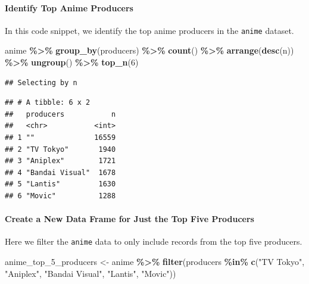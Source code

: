 \documentclass[
  b5paper]{book}
\newenvironment{Shaded}{\begin{snugshade}}{\end{snugshade}}
\newcommand{\DecValTok}[1]{\textcolor[rgb]{0.00,0.00,0.81}{#1}}
\newcommand{\FunctionTok}[1]{\textcolor[rgb]{0.13,0.29,0.53}{\textbf{#1}}}
\newcommand{\NormalTok}[1]{#1}
\newcommand{\OtherTok}[1]{\textcolor[rgb]{0.56,0.35,0.01}{#1}}
\newcommand{\SpecialCharTok}[1]{\textcolor[rgb]{0.81,0.36,0.00}{\textbf{#1}}}
\newcommand{\StringTok}[1]{\textcolor[rgb]{0.31,0.60,0.02}{#1}}
\begin{document}
\hypertarget{identify-top-anime-producers}{%
\paragraph*{Identify Top Anime Producers}\label{identify-top-anime-producers}}

In this code snippet, we identify the top anime producers in the \texttt{anime} dataset.

\begin{Shaded}
\begin{Highlighting}[]
\NormalTok{anime }\SpecialCharTok{\%\textgreater{}\%}
  \FunctionTok{group\_by}\NormalTok{(producers) }\SpecialCharTok{\%\textgreater{}\%}
  \FunctionTok{count}\NormalTok{() }\SpecialCharTok{\%\textgreater{}\%}
  \FunctionTok{arrange}\NormalTok{(}\FunctionTok{desc}\NormalTok{(n)) }\SpecialCharTok{\%\textgreater{}\%}
  \FunctionTok{ungroup}\NormalTok{() }\SpecialCharTok{\%\textgreater{}\%}
  \FunctionTok{top\_n}\NormalTok{(}\DecValTok{6}\NormalTok{)}
\end{Highlighting}
\end{Shaded}

\begin{verbatim}
## Selecting by n
\end{verbatim}

\begin{verbatim}
## # A tibble: 6 x 2
##   producers           n
##   <chr>           <int>
## 1 ""              16559
## 2 "TV Tokyo"       1940
## 3 "Aniplex"        1721
## 4 "Bandai Visual"  1678
## 5 "Lantis"         1630
## 6 "Movic"          1288
\end{verbatim}

\hypertarget{create-a-new-data-frame-for-just-the-top-five-producers}{%
\paragraph*{Create a New Data Frame for Just the Top Five Producers}\label{create-a-new-data-frame-for-just-the-top-five-producers}}

Here we filter the \texttt{anime} data to only include records from the top five producers.

\begin{Shaded}
\begin{Highlighting}[]
\NormalTok{anime\_top\_5\_producers }\OtherTok{\textless{}{-}}\NormalTok{ anime }\SpecialCharTok{\%\textgreater{}\%}
  \FunctionTok{filter}\NormalTok{(producers }\SpecialCharTok{\%in\%} \FunctionTok{c}\NormalTok{(}\StringTok{"TV Tokyo"}\NormalTok{, }\StringTok{"Aniplex"}\NormalTok{, }\StringTok{"Bandai Visual"}\NormalTok{, }\StringTok{"Lantis"}\NormalTok{, }\StringTok{"Movic"}\NormalTok{))}
\end{Highlighting}
\end{Shaded}
\end{document}
